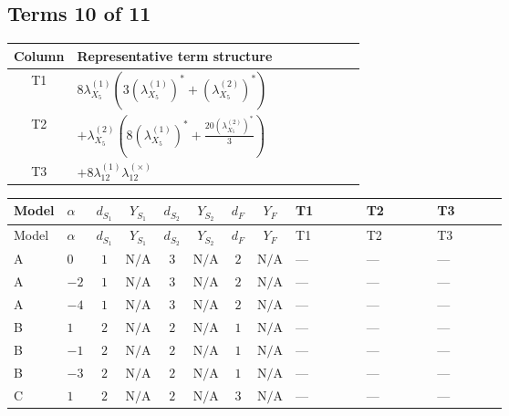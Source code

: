 \documentclass[8pt]{article}
\begin{document}
\begin{landscape}
\subsection*{Terms 10 of 11}
\begin{center}
\begin{tabular}{@{}c >{\raggedright\arraybackslash}p{0.82\linewidth}@{}}
\toprule
Column & Representative term structure \\
\midrule
T1 & \(\displaystyle 8 {\lambda_{X_{5}}^{(1)}} (3 \left({\lambda_{X_{5}}^{(1)}}\right)^{*}+\left({\lambda_{X_{5}}^{(2)}}\right)^{*})\) \\
\midrule
T2 & \(\displaystyle +{\lambda_{X_{5}}^{(2)}} \left(8 \left({\lambda_{X_{5}}^{(1)}}\right)^{*}+\frac{20 \left({\lambda_{X_{5}}^{(2)}}\right)^{*}}{3}\right)\) \\
\midrule
T3 & \(\displaystyle +8 {\lambda_{12}^{(1)}} {\lambda_{12}^{(\times)}}\) \\
\midrule
\bottomrule
\end{tabular}
\end{center}
\smallskip
\tiny
\begin{longtable}{@{}llcccccc >{\raggedright\arraybackslash}p{0.21\linewidth} >{\raggedright\arraybackslash}p{0.21\linewidth} >{\raggedright\arraybackslash}p{0.21\linewidth}@{}}
\toprule
Model & $\alpha$ & $d_{S_1}$ & $Y_{S_1}$ & $d_{S_2}$ & $Y_{S_2}$ & $d_F$ & $Y_F$ & T1 & T2 & T3 \\
\midrule
\endfirsthead
\toprule
Model & $\alpha$ & $d_{S_1}$ & $Y_{S_1}$ & $d_{S_2}$ & $Y_{S_2}$ & $d_F$ & $Y_F$ & T1 & T2 & T3 \\
\midrule
\endhead
A & $0$ & $1$ & $\text{N/A}$ & $3$ & $\text{N/A}$ & $2$ & $\text{N/A}$ & --- & --- & --- \\
\midrule
A & $-2$ & $1$ & $\text{N/A}$ & $3$ & $\text{N/A}$ & $2$ & $\text{N/A}$ & --- & --- & --- \\
\midrule
A & $-4$ & $1$ & $\text{N/A}$ & $3$ & $\text{N/A}$ & $2$ & $\text{N/A}$ & --- & --- & --- \\
\midrule
B & $1$ & $2$ & $\text{N/A}$ & $2$ & $\text{N/A}$ & $1$ & $\text{N/A}$ & --- & --- & --- \\
\midrule
B & $-1$ & $2$ & $\text{N/A}$ & $2$ & $\text{N/A}$ & $1$ & $\text{N/A}$ & --- & --- & --- \\
\midrule
B & $-3$ & $2$ & $\text{N/A}$ & $2$ & $\text{N/A}$ & $1$ & $\text{N/A}$ & --- & --- & --- \\
\midrule
C & $1$ & $2$ & $\text{N/A}$ & $2$ & $\text{N/A}$ & $3$ & $\text{N/A}$ & --- & --- & --- \\

\end{longtable}
\end{landscape}
\end{document}
